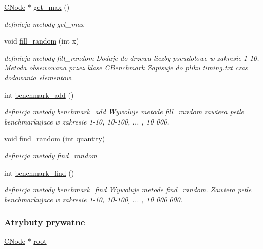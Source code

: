 \begin{DoxyCompactItemize}
\hyperlink{class_c_node}{C\+Node} $\ast$ \hyperlink{class_c_tree_adfae6615a57297695335bc6d48248c89}{get\+\_\+max} ()
\begin{DoxyCompactList}\small\item\em definicja metody get\+\_\+max \end{DoxyCompactList}\item 
void \hyperlink{class_c_tree_a866131d7d4560108e1c1784fd280c306}{fill\+\_\+random} (int x)
\begin{DoxyCompactList}\small\item\em definicja metody fill\+\_\+random Dodaje do drzewa liczby pseudolowe w zakresie 1-\/10. Metoda obsewowana przez klase \hyperlink{class_c_benchmark}{C\+Benchmark} Zapisuje do pliku timing.\+txt czas dodawania elementow. \end{DoxyCompactList}\item 
int \hyperlink{class_c_tree_a703af3ff87ae4cee902075e88e65b21f}{benchmark\+\_\+add} ()
\begin{DoxyCompactList}\small\item\em definicja metody benchmark\+\_\+add Wywoluje metode fill\+\_\+random zawiera petle benchmarkujace w zakresie 1-\/10, 10-\/100, ... , 10 000. \end{DoxyCompactList}\item 
void \hyperlink{class_c_tree_af61a453f2128222861b08aba83d32380}{find\+\_\+random} (int quantity)
\begin{DoxyCompactList}\small\item\em definicja metody find\+\_\+random \end{DoxyCompactList}\item 
int \hyperlink{class_c_tree_aa76d3a853d9bf213500ad7e6cfe0270d}{benchmark\+\_\+find} ()
\begin{DoxyCompactList}\small\item\em definicja metody benchmark\+\_\+find Wywoluje metode find\+\_\+random. Zawiera petle benchmarkujace w zakresie 1-\/10, 10-\/100, ... , 10 000 000. \end{DoxyCompactList}\end{DoxyCompactItemize}
\subsubsection*{Atrybuty prywatne}
\begin{DoxyCompactItemize}
\item 
\hyperlink{class_c_node}{C\+Node} $\ast$ \hyperlink{class_c_tree_a01a3595bbd583c795eed909d0d92b81b}{root}
\end{DoxyCompactItemize}


